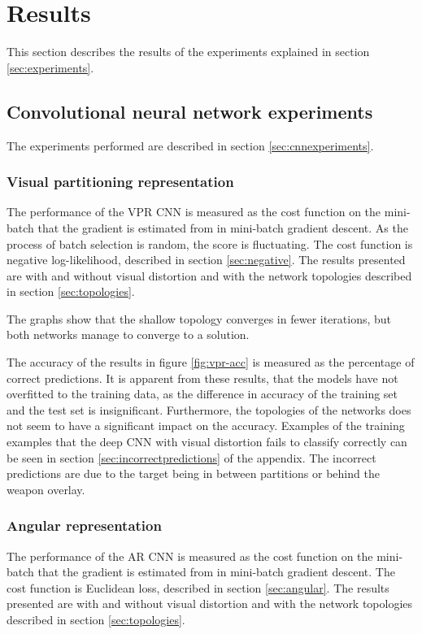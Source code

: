 
\section{Results}
This section describes the results of the experiments explained in section \ref{sec:experiments}.

\label{sec:results}

\subsection{Convolutional neural network experiments}
The experiments performed are described in section \ref{sec:cnnexperiments}.
\subsubsection{Visual partitioning representation}
The performance of the VPR CNN is measured as the cost function on the mini-batch that the gradient is estimated from in mini-batch gradient descent. As the process of batch selection is random, the score is fluctuating. The cost function is negative log-likelihood, described in section \ref{sec:negative}.
The results presented are with and without visual distortion and with the network topologies described in section \ref{sec:topologies}.


\noindent
The graphs show that the shallow topology converges in fewer iterations, but both networks manage to converge to a solution. 


\noindent
The accuracy of the results in figure \ref{fig:vpr-acc} is measured as the percentage of correct predictions. It is apparent from these results, that the models have not overfitted to the training data, as the difference in accuracy of the training set and the test set is insignificant. Furthermore, the topologies of the networks does not seem to have a significant impact on the accuracy. Examples of the training examples that the deep CNN with visual distortion fails to classify correctly can be seen in section \ref{sec:incorrectpredictions} of the appendix. The incorrect predictions are due to the target being in between partitions or behind the weapon overlay.

\subsubsection{Angular representation}
The performance of the AR CNN is measured as the cost function on the mini-batch that the gradient is estimated from in mini-batch gradient descent. The cost function is Euclidean loss, described in section \ref{sec:angular}.
The results presented are with and without visual distortion and with the network topologies described in section \ref{sec:topologies}.


